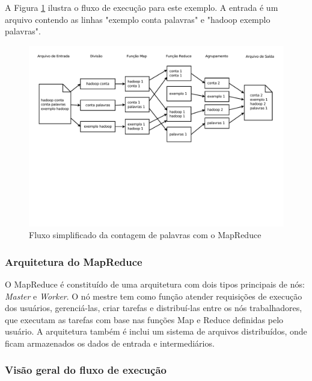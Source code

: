 A Figura \ref{fig:MapReduceexemplo} ilustra o fluxo de execução para este exemplo. A entrada é um arquivo contendo as linhas "exemplo conta palavras" e "hadoop exemplo palavras".

\begin{figure}[htb]
\centering
\includegraphics[trim=0cm 9cm 0cm 1cm, width=\textwidth]{figuras/MapReduceExemplo.pdf}
\caption{Fluxo simplificado da contagem de palavras com o MapReduce}
\label{fig:MapReduceexemplo}
\end{figure}

\subsubsection{Arquitetura do MapReduce}
O MapReduce é constituído de uma arquitetura com dois tipos principais de nós: \textit{Master} e \textit{Worker}. O nó mestre tem como função atender requisições de execução dos usuários, gerenciá-las, criar tarefas e distribuí-las entre os nós trabalhadores, que executam as tarefas com base nas funções Map e Reduce definidas pelo usuário.
A arquitetura também é inclui um sistema de arquivos distribuídos, onde ficam armazenados os dados de entrada e intermediários.



\subsubsection{Visão geral do fluxo de execução}


